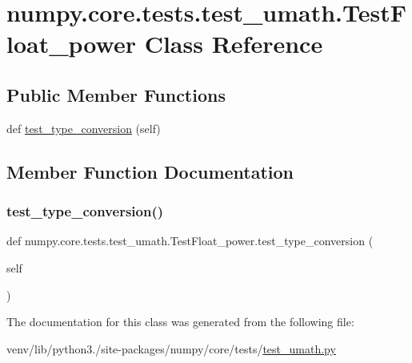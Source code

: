 \hypertarget{classnumpy_1_1core_1_1tests_1_1test__umath_1_1TestFloat__power}{}\section{numpy.\+core.\+tests.\+test\+\_\+umath.\+Test\+Float\+\_\+power Class Reference}
\label{classnumpy_1_1core_1_1tests_1_1test__umath_1_1TestFloat__power}
\subsection*{Public Member Functions}
\begin{DoxyCompactItemize}
\item 
def \hyperlink{classnumpy_1_1core_1_1tests_1_1test__umath_1_1TestFloat__power_a5172c63c436ddcb8ee7d21318154fc45}{test\+\_\+type\+\_\+conversion} (self)
\end{DoxyCompactItemize}


\subsection{Member Function Documentation}
\mbox{\label{classnumpy_1_1core_1_1tests_1_1test__umath_1_1TestFloat__power_a5172c63c436ddcb8ee7d21318154fc45}} 
\subsubsection{\texorpdfstring{test\+\_\+type\+\_\+conversion()}{test\_type\_conversion()}}
{\footnotesize\ttfamily def numpy.\+core.\+tests.\+test\+\_\+umath.\+Test\+Float\+\_\+power.\+test\+\_\+type\+\_\+conversion (\begin{DoxyParamCaption}\item[{}]{self }\end{DoxyParamCaption})}



The documentation for this class was generated from the following file\+:\begin{DoxyCompactItemize}
\item 
venv/lib/python3./site-\/packages/numpy/core/tests/\hyperlink{test__umath_8py}{test\+\_\+umath.\+py}\end{DoxyCompactItemize}
